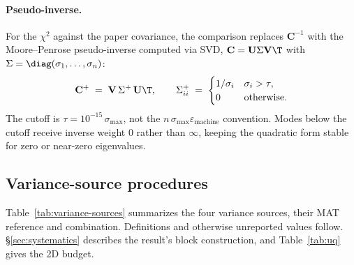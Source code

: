 \paragraph{Pseudo-inverse.} For the $\chi^{2}$ against the paper covariance, the comparison replaces $\mathbf{C}^{-1}$ with the Moore--Penrose pseudo-inverse computed via SVD, $\mathbf{C}=\mathbf{U}\Sigma\mathbf{V}\T$ with $\Sigma=\diag(\sigma_{1},\dots,\sigma_{n})$:
\begin{equation}
\mathbf{C}^{+} \;=\; \mathbf{V}\,\Sigma^{+}\,\mathbf{U}\T,
\qquad
\Sigma^{+}_{ii} \;=\;
\begin{cases}
1/\sigma_{i} & \sigma_{i} > \tau,\\
0 & \text{otherwise}.
\end{cases}
\end{equation}
The cutoff is $\tau = 10^{-15}\,\sigma_{\max}$, not the $n\,\sigma_{\max}\varepsilon_{\text{machine}}$ convention. Modes below the cutoff receive inverse weight $0$ rather than $\infty$, keeping the quadratic form stable for zero or near-zero eigenvalues.

\subsection{Variance-source procedures}
\label{sec:variance}

Table~\ref{tab:variance-sources} summarizes the four variance sources, their MAT reference and combination. Definitions and otherwise unreported values follow. \S\ref{sec:systematics} describes the result's block construction, and Table~\ref{tab:uq} gives the 2D budget.

